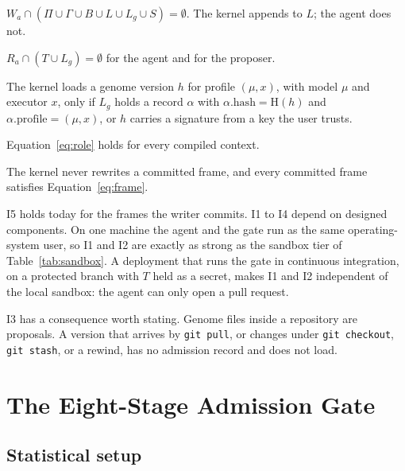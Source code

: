 \documentclass[11pt,a4paper]{article}
\begin{document}
\begin{description}[leftmargin=1.2em,itemsep=3pt]
\item[I1 (write barrier)] $W_a\cap(\Pi\cup\Gamma\cup B\cup L\cup L_g\cup S)=\emptyset$. The kernel appends to $L$; the agent does not.
\item[I2 (read barrier)] $R_a\cap(T\cup L_g)=\emptyset$ for the agent and for the proposer.
\item[I3 (admitted load)] The kernel loads a genome version $h$ for profile $(\mu,x)$, with model $\mu$ and executor $x$, only if $L_g$ holds a record $\alpha$ with $\alpha.\mathrm{hash}=\mathrm{H}(h)$ and $\alpha.\mathrm{profile}=(\mu,x)$, or $h$ carries a signature from a key the user trusts.
\item[I4 (role preservation)] Equation~\eqref{eq:role} holds for every compiled context.
\item[I5 (append-only log)] The kernel never rewrites a committed frame, and every committed frame satisfies Equation~\eqref{eq:frame}.
\end{description}

I5 holds today for the frames the writer commits. I1 to I4 depend on designed components. On one machine the agent and the gate run as the same operating-system user, so I1 and I2 are exactly as strong as the sandbox tier of Table~\ref{tab:sandbox}. A deployment that runs the gate in continuous integration, on a protected branch with $T$ held as a secret, makes I1 and I2 independent of the local sandbox: the agent can only open a pull request.

I3 has a consequence worth stating. Genome files inside a repository are proposals. A version that arrives by \texttt{git pull}, or changes under \texttt{git checkout}, \texttt{git stash}, or a rewind, has no admission record and does not load.

\section{The Eight-Stage Admission Gate}
\label{sec:gate}

\subsection{Statistical setup}
\end{document}
